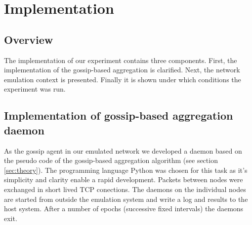 \section{Implementation}
\label{sec:implementation}
\subsection{Overview}
The implementation of our experiment contains three components. First, the implementation of the gossip-based aggregation is clarified. Next, the network emulation context is presented. Finally it is shown under which conditions the experiment was run.

\subsection{Implementation of gossip-based aggregation daemon}
As the gossip agent in our emulated network we developed a daemon based on the pseudo code of the gossip-based aggregation algorithm (see section \ref{sec:theory}). The programming language Python \cite{python} was chosen for this task as it's simplicity and clarity enable a rapid development. Packets between nodes were exchanged in short lived TCP conections. The daemons on the individual nodes are started from outside the emulation system and write a log and results to the host system. After a number of epochs (successive fixed intervals) the daemons exit.

